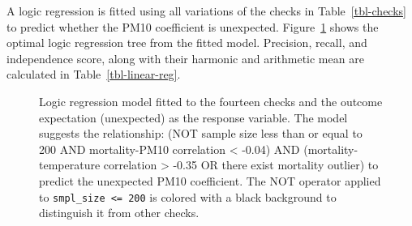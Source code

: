 \documentclass[
  12pt,
]{interact}
\begin{document}
A logic regression is fitted using all variations of the checks in
Table~\ref{tbl-checks} to predict whether the PM10 coefficient is
unexpected. Figure~\ref{fig-linear-reg-tree} shows the optimal logic
regression tree from the fitted model. Precision, recall, and
independence score, along with their harmonic and arithmetic mean are
calculated in Table~\ref{tbl-linear-reg}.

\begin{figure}


\caption{\label{fig-linear-reg-tree}Logic regression model fitted to the
fourteen checks and the outcome expectation (unexpected) as the response
variable. The model suggests the relationship: (NOT sample size less
than or equal to 200 AND mortality-PM10 correlation \textless{} -0.04)
AND (mortality-temperature correlation \textgreater{} -0.35 OR there
exist mortality outlier) to predict the unexpected PM10 coefficient. The
NOT operator applied to \texttt{smpl\_size\ \textless{}=\ 200} is
colored with a black background to distinguish it from other checks.}

\end{figure}%
\end{document}
